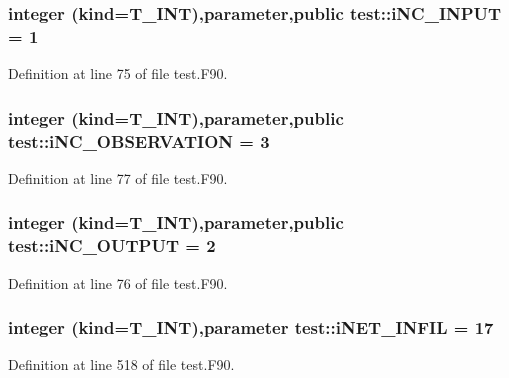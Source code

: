\hypertarget{namespacetest_a47a3dcd6434015912debe4d7c32a6696}{
\subsubsection[{iNC\_\-INPUT}]{\setlength{\rightskip}{0pt plus 5cm}integer (kind={\bf T\_\-INT}),parameter,public {\bf test::iNC\_\-INPUT} = 1}}
\label{namespacetest_a47a3dcd6434015912debe4d7c32a6696}


Definition at line 75 of file test.F90.

\hypertarget{namespacetest_a6a723368a0f10bdf178fcec29f827e5d}{
\subsubsection[{iNC\_\-OBSERVATION}]{\setlength{\rightskip}{0pt plus 5cm}integer (kind={\bf T\_\-INT}),parameter,public {\bf test::iNC\_\-OBSERVATION} = 3}}
\label{namespacetest_a6a723368a0f10bdf178fcec29f827e5d}


Definition at line 77 of file test.F90.

\hypertarget{namespacetest_a0201f90a40599962ba9f170b55b2940b}{
\subsubsection[{iNC\_\-OUTPUT}]{\setlength{\rightskip}{0pt plus 5cm}integer (kind={\bf T\_\-INT}),parameter,public {\bf test::iNC\_\-OUTPUT} = 2}}
\label{namespacetest_a0201f90a40599962ba9f170b55b2940b}


Definition at line 76 of file test.F90.

\hypertarget{namespacetest_aefca9a9826cf4312056bd27752aece6d}{
\subsubsection[{iNET\_\-INFIL}]{\setlength{\rightskip}{0pt plus 5cm}integer (kind={\bf T\_\-INT}),parameter {\bf test::iNET\_\-INFIL} = 17}}
\label{namespacetest_aefca9a9826cf4312056bd27752aece6d}


Definition at line 518 of file test.F90.

